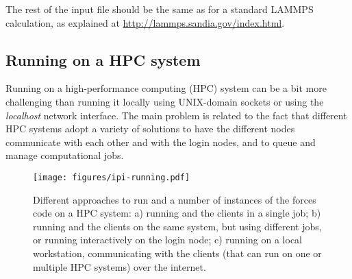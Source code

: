 \documentclass[11pt,english,fleqn]{report}
\begin{document}
The rest of the input file should be the same as for a standard LAMMPS 
calculation, as explained at \url{http://lammps.sandia.gov/index.html}.

\subsection{Running on a HPC system}\label{hpc}

Running \ipi on a high-performance computing (HPC) system can be a bit more challenging
than running it locally using UNIX-domain sockets or using the \emph{localhost} 
network interface.
The main problem is related to the fact that different HPC systems adopt
a variety of solutions to have the different nodes communicate with each other
and with the login nodes, and to queue and manage computational jobs. 
 
\begin{figure}[hbt]
\centering\texttt{[image: figures/ipi-running.pdf]}
\caption{\label{fig:running} Different approaches to run \ipi and a number of 
instances of the forces code on a HPC system: a) running \ipi and the clients in a single
job; b) running \ipi and the clients on the same system, but using different jobs, or running
\ipi interactively on the login node; c) running \ipi on a local workstation, communicating
with the clients (that can run on one or multiple HPC systems) over the internet. } 
\end{figure}
\end{document}
